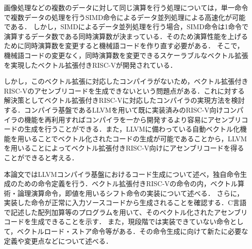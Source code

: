 画像処理などの複数のデータに対して同じ演算を行う処理については，単一命令で複数データの処理を行うSIMD命令によるデータ並列処理による高速化が可能である．
しかし，SIMDによるデータ並列処理を行う場合，SIMD命令は1命令で演算するデータ数である同時演算数が決まっている．そのため演算性能を上げるために同時演算数を変更すると機械語コードを作り直す必要がある．
そこで，機械語コードの変更なく，同時演算数を変更できるスケーラブルなベクトル拡張を実現したベクトル拡張付きRISC-Vが開発されている．

しかし，このベクトル拡張に対応したコンパイラがないため，ベクトル拡張付きRISC-Vのアセンブリコードを生成できないという問題点がある．これに対する解決策としてベクトル拡張付きRISC-Vに対応したコンパイラの実現方法を検討する．コンパイラ基盤であるLLVMを用いて既に実装済みのRISC-V向けコンパイラの機能を再利用すればコンパイラを一から開発するより容易にアセンブリコードの生成を行うことができる．また，LLVMに備わっている自動ベクトル化機能を用いることでベクトル化されたコードの生成が可能であることから，LLVMを用いることによってベクトル拡張付きRISC-V向けにアセンブリコードを得ることができると考える．

本論文ではLLVMコンパイラ基盤におけるコード生成について述べ，独自命令生成のための命令定義を行う．ベクトル拡張付きRISC-Vの命令の内，ベクトル算術・論理演算命令，即値を用いるシフト命令の実装について述べる．
さらに，実装した命令が正常に入力ソースコードから生成されることを確認する．C言語で記述した配列加算等のプログラムを用いて、そのベクトル化されたアセンブリコードを生成できることを示す．
また，現段階では実装できていない命令として，ベクトルロード・ストア命令等がある．その命令生成に向けて新たに必要な定義や変更点などについて述べる．